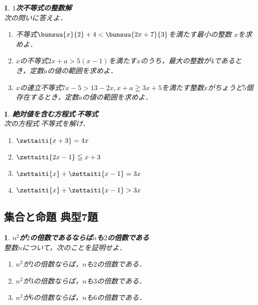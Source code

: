 \documentclass[10pt,
fleqn,
dvipdfmx,
uplatex
]{jsarticle}
\newtheorem{question}[Question]{}
\begin{document}
\begin{question}{\bf\boldmath $1$次不等式の整数解}\\
次の問いに答えよ．
\begin{enumerate}
\item 不等式$\bunsuu{x}{2}+4<\bunsuu{{2x+7}}{3}$を満たす最小の整数
$x$を求めよ．
\item $x$の不等式$2x+a>5\left(x-1\right)$を満たす$x$のうち，最大の整数が$4$であるとき，定数$a$の値の範囲を求めよ．
\item $x$の連立不等式$7x-5>{13}-2x, x+a\geqq 3x+5$を満たす整数$x$がちょうど$5$個存在するとき，定数$a$の値の範囲を求めよ．
\end{enumerate}

\end{question}



\begin{question}{\bf\boldmath 絶対値を含む方程式$\cdot$不等式}\\
次の方程式$\cdot$不等式を解け．
\begin{enumerate}
\item $\zettaiti{x+3}=4x$
\item $\zettaiti{2x-1}\leqq x+3$
\item $\zettaiti{x}+\zettaiti{x-1}=3x$
\item $\zettaiti{x}+\zettaiti{x-1}>3x$
\end{enumerate}

\end{question}

\subsection{集合と命題 典型7題}



\begin{question}{\bf\boldmath $n^2$が$2$の倍数であるならば$n$も$2$の倍数である}\\
整数$n$について，次のことを証明せよ．
\begin{enumerate}
\item $n^2$が$2$の倍数ならば，$n$も$2$の倍数である．
\item $n^2$が$3$の倍数ならば，$n$も$3$の倍数である．
\item $n^2$が$6$の倍数ならば，$n$も$6$の倍数である．
\end{enumerate}

\end{question}
\end{document}
